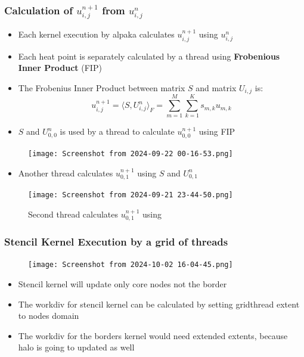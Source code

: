 \documentclass[9pt]{beamer}
\begin{document}
\begin{frame}
\frametitle{Calculation of $u_{i,j}^{n+1}$ from $u_{i,j}^{n}$}
\vspace{-0.1\baselineskip}
    \begin{itemize}
        \item Each kernel execution by alpaka calculates $u_{i,j}^{n+1}$ using $u_{i,j}^{n}$
        \item Each heat point is separately calculated by a thread using \textbf{Frobenious Inner Product} (FIP)
        \item The Frobenius Inner Product between matrix \( S \) and matrix \( U_{i,j} \) is:
\[
 u_{i,j}^{n+1} = \langle S, U^{n}_{i,j} \rangle_F = \sum_{m=1}^{M} \sum_{k=1}^{K} s_{m,k} u_{m,k}
\]
        \item $S$ and $U^{n}_{0,0}$ is used  by a thread to calculate $u_{0,0}^{n+1}$ using FIP
    \end{itemize}
    \begin{figure}
        \centering
            \texttt{[image: Screenshot from 2024-09-22 00-16-53.png]}
        \label{fig:enter-label}
    \end{figure}
\end{frame}

\begin{frame}
\vspace{-0.9\baselineskip}
    \begin{itemize}
        \item Another thread calculates $u_{0,1}^{n+1}$  using $S$ and $U^{n}_{0,1}$
    \end{itemize}
    \begin{figure}
        \centering
        \texttt{[image: Screenshot from 2024-09-21 23-44-50.png]}
        \caption{Second thread calculates $u_{0,1}^{n+1}$ using }
        \label{fig:enter-label}
    \end{figure}
\end{frame}

\begin{frame}
\frametitle{Stencil Kernel Execution by a grid of threads}
\begin{figure}
    \centering
    \texttt{[image: Screenshot from 2024-10-02 16-04-45.png]}
\end{figure}

\begin{itemize}
    \item Stencil kernel will update only core nodes not the border
    \item The workdiv for stencil kernel can be calculated by setting gridthread extent to nodes domain
    \item The workdiv for the borders kernel would need extended extents, because halo is going to updated as well
\end{itemize}


\end{frame}
\end{document}
